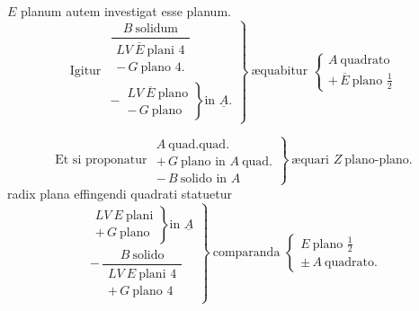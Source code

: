 \documentclass[11pt,a4paper]{article}
\begin{document}
$E$ planum autem investigat esse  planum.
\[ \text{Igitur } \left.\begin{array}{l} \dfrac{B\ \text{solidum}}{\begin{array}{l} LV\ \overline{E}\ \text{plani } 4 \\ -\,G\ \text{plano } 4. \end{array}} \\[2ex] -\,\left.\begin{array}{l} LV\ \overline{E}\ \text{plano} \\ -\,G\ \text{plano} \end{array}\right\} \text{in } \underline{A}. \end{array}\right\}\ \text{æquabitur } \left\{\begin{array}{l} A\ \text{quadrato} \\ +\,\overline{E}\ \text{plano } \frac{1}{2} \end{array}\right. \]

\[ \text{Et si proponatur } \left.\begin{array}{l} A\ \text{quad.quad.} \\ +\,G\ \text{plano in } A\ \text{quad.} \\ -\,B\ \text{solido in } A \end{array}\right\}\ \text{æquari } Z\ \text{plano-plano.} \]
radix plana effingendi quadrati statuetur
\[ \left.\begin{array}{l} \left.\begin{array}{l} LV\ E\ \text{plani} \\ +\,G\ \text{plano} \end{array}\right\} \text{in } \underline{A} \\[2ex] -\,\dfrac{B\ \text{solido}}{\begin{array}{l} LV\ E\ \text{plani } 4 \\ +\,G\ \text{plano } 4 \end{array}} \end{array}\right\}\ \text{comparanda } \left\{\begin{array}{l} E\ \text{plano } \frac{1}{2} \\ \pm\,A\ \text{quadrato.} \end{array}\right. \]
\end{document}

